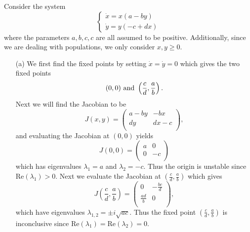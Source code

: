 \documentclass[12pt]{report}
\begin{document}
\begin{solution}

    \noindent
    Consider the system
    \begin{equation}
        \left\{\begin{array}{l}
        \dot{x}=x(a-by) \\
        \dot{y}=y(-c+dx)
        \end{array}\right.
    \end{equation}
    where the parameters $a,b,c,c$ are all assumed to be positive. Additionally, since we are dealing with populations, we only consider $x,y \geq 0$. 

    \begin{enumerate}
        \item [(a)]
            We first find the fixed points by setting $\dot x = \dot y = 0$ which gives the two fixed points
            \[ 
                (0,0) {~\text{and}~} \left(\frac{c}{d},\frac{a}{b}\right).
            \]
            Next we will find the Jacobian to be
            \[ 
                J(x,y) = \left(
                    \begin{array}{cc}
                     a-b y & -b x \\
                     d y & d x-c \\
                    \end{array}
                    \right),
            \] 
            and evaluating the Jacobian at $(0,0)$ yields
            \[ 
                J(0,0) = \left(
                    \begin{array}{cc}
                     a & 0 \\
                     0 & -c \\
                    \end{array}
                    \right)
            \]
            which has eigenvalues $\lambda_1 = a$ and $\lambda_2 = -c$. Thus the origin is unstable since $\text{Re}\left(\lambda_1\right) > 0$. Next we evaluate the Jacobian at $ \left(\frac{c}{d},\frac{a}{b}\right)$ which gives
            \[ 
                J\left(\frac{c}{d},\frac{a}{b}\right) = \left(
                    \begin{array}{cc}
                     0 & -\frac{b c}{d} \\
                     \frac{a d}{b} & 0 \\
                    \end{array}
                    \right), 
            \] 
            which have eigenvalues $\lambda_{1,2} = \pm i \sqrt{ac}$. Thus the fixed point $\left(\frac{c}{d},\frac{a}{b}\right)$ is inconclusive since $\text{Re}(\lambda_1) = \text{Re}(\lambda_2) = 0$. 



\end{enumerate}
\end{solution}
\end{document}
